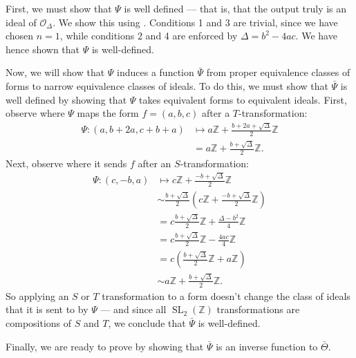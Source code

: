 \documentclass[honours,12pt]{unswthesis}
\newcommand{\Z}{\mathbb{Z}} %
\newcommand{\order}{\mathcal{O}} %
\DeclareMathOperator{\SL}{SL}
\numberwithin{equation}{section}
\begin{document}
First, we must show that $\Psi$ is well defined --- 
that is, that the output truly is an ideal of $\order_\Delta$.
We show this using .
Conditions 1 and 3 are trivial, since we have chosen $n = 1$, while conditions 2 and 4 are enforced by $\Delta = b^2 - 4ac$.
We have hence shown that $\Psi$ is well-defined.

Now, we will show that $\Psi$ induces a function $\bar{\Psi}$ from proper equivalence classes of forms to narrow equivalence classes of ideals.
To do this, we must show that $\bar{\Psi}$ is well defined by showing that $\Psi$ takes equivalent forms to equivalent ideals.
First, observe where $\Psi$ maps the form $f = (a, b, c)$ after a $T$-transformation:
\begin{align*}
    \Psi : (a, b + 2a, c + b + a) &\mapsto a\Z + \frac{b + 2a + \sqrt\Delta}{2}\Z \\
    &= a\Z + \frac{b + \sqrt\Delta}{2}\Z.
\end{align*}
Next, observe where it sends $f$ after an $S$-transformation:
\begin{align*}
    \Psi : (c, -b, a) &\mapsto c\Z + \frac{- b + \sqrt\Delta}{2}\Z \\
    &\sim \frac{b + \sqrt\Delta}{2} \left( c\Z + \frac{- b + \sqrt\Delta}{2}\Z \right) \\
    &= c \frac{b + \sqrt\Delta}{2} \Z + \frac{\Delta - b^2}{4}\Z  \\
    &= c \frac{b + \sqrt\Delta}{2} \Z - \frac{4ac}{4}\Z  \\
    &= c \left( \frac{b + \sqrt\Delta}{2} \Z + a\Z \right) \\
    &\sim a\Z + \frac{b + \sqrt\Delta}{2}\Z.
\end{align*}  
So applying an $S$ or $T$ transformation to a form doesn't change the class of ideals that it is sent to by $\Psi$ --- 
and since all $\SL_2(\Z)$ transformations are compositions of $S$ and $T$, we conclude that $\bar{\Psi}$ is well-defined.

Finally, we are ready to prove  by showing that $\bar{\Psi}$ is an inverse function to $\bar{\Theta}$.
\end{document}
